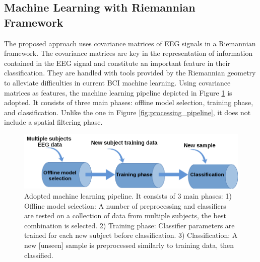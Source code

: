 \subsection*{Machine Learning with Riemannian Framework}
The proposed approach uses covariance matrices of EEG signals in a Riemannian framework.
The covariance matrices are key in the representation of information contained in the EEG signal and constitute an important feature in their classification. 
They are handled with tools provided by the Riemannian geometry to alleviate difficulties in current BCI machine learning.
Using covariance matrices as features, the machine learning pipeline depicted in Figure \ref{fig:porposed-pipeline} is adopted.
It consists of three main phases: offline model selection, training phase, and classification.
Unlike the one in Figure \ref{fig:processing_pipeline}, it does not include a spatial filtering phase.

\begin{figure}
\centering
\includegraphics[width=0.8\columnwidth]{Figures/proposed-processing-pipeline.png}
\caption{Adopted machine learning pipeline. It consists of 3 main phases: 1) Offline model selection: A number of preprocessing and classifiers are tested on a collection of data from multiple subjects, the best combination is selected. 2) Training phase: Classifier parameters are trained for each new subject before classification. 3) Classification: A new [unseen] sample is preprocessed similarly to training data, then classified.}
\label{fig:porposed-pipeline}
\end{figure}  